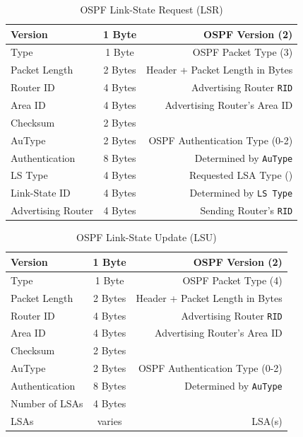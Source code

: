\documentclass[12pt]{article}
\begin{document}
	\begin{table}[H]
	\centering
	\caption{OSPF Link-State Request (LSR) \label{tab:OSPF LSR}}
	\begin{tabular}{| l | c | r |}
	\hline
	Version			& 1 Byte	& OSPF Version (2)\\\hline
	Type				& 1 Byte	& OSPF Packet Type (3)\\\hline
	Packet Length		& 2 Bytes	& Header + Packet Length in Bytes\\\hline
	Router ID			& 4 Bytes	& Advertising Router \texttt{RID}\\\hline
	Area ID			& 4 Bytes	& Advertising Router's Area ID\\\hline
	Checksum			& 2 Bytes	&\\\hline
	AuType			& 2 Bytes	& OSPF Authentication Type (0-2)\\\hline
	Authentication		& 8 Bytes	& Determined by \texttt{AuType}\\\hline
	LS Type			& 4 Bytes	& Requested LSA Type (\Cref{tab:OSPF LSA TYPES})\\\hline
	Link-State ID		& 4 Bytes	& Determined by \texttt{LS Type}\\\hline
	Advertising Router	& 4 Bytes	& Sending Router's \texttt{RID}\\\hline
	\end{tabular}\end{table}

	\begin{table}[H]
	\centering
	\caption{OSPF Link-State Update (LSU) \label{tab:OSPF LSU}}
	\begin{tabular}{| l | c | r |}
	\hline
	Version		& 1 Byte	& OSPF Version (2)\\\hline
	Type			& 1 Byte	& OSPF Packet Type (4)\\\hline
	Packet Length	& 2 Bytes	& Header + Packet Length in Bytes\\\hline
	Router ID		& 4 Bytes	& Advertising Router \texttt{RID}\\\hline
	Area ID		& 4 Bytes	& Advertising Router's Area ID\\\hline
	Checksum		& 2 Bytes	&\\\hline
	AuType		& 2 Bytes	& OSPF Authentication Type (0-2)\\\hline
	Authentication	& 8 Bytes	& Determined by \texttt{AuType}\\\hline
	Number of LSAs	& 4 Bytes	&\\\hline
	LSAs			& varies	& LSA(s)\\\hline
	\end{tabular}\end{table}
\end{document}
